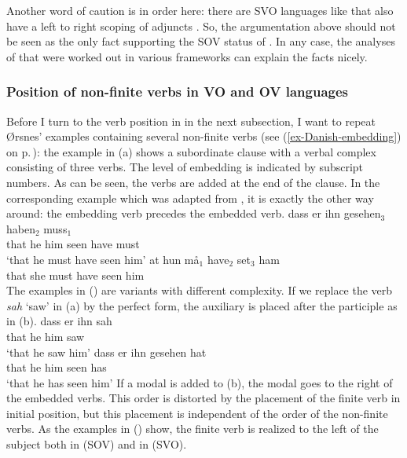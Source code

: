 Another word of caution is in order here: there are SVO languages like  that also have a left
to right scoping of adjuncts \citep[--161]{BGK2004a-u}. So, the argumentation above should not be seen as the only
fact supporting the SOV status of . In any case, the analyses of  that were
worked out in various frameworks can explain the facts nicely.


\subsubsection{Position of non-finite verbs in VO and OV languages}

Before I turn to the verb position in  in the next subsection, I want to repeat Ørsnes'
examples containing several non-finite verbs (see (\ref{ex-Danish-embedding}) on p.\,\pageref{ex-Danish-embedding}): the example in (a) shows a  subordinate clause with a verbal complex consisting of
three verbs. The level of embedding is indicated by subscript numbers. As can be seen, the verbs are
added at the end of the clause. In the corresponding  example which was adapted from \citet[]{Oersnes2009b}, it is exactly the other way
around: the embedding verb precedes the embedded verb.
\eal
\ex
\gll dass er ihn gesehen$_3$ haben$_2$ muss$_1$\\
     that he him seen        have      must\\\german
\glt `that he must have seen him'
\ex
\gll at hun må$_1$ have$_2$ set$_3$ ham\\
     that she must have seen him\\\danish
\zl
%
The examples in () are variants with different complexity. If we replace the verb
\emph{sah} `saw' in (a) by the perfect form, the auxiliary is placed after the participle as
in (b).
\eal
\ex
\gll dass er ihn sah\\
     that he him saw\\\german
\glt `that he saw him'
\ex
\gll dass er ihn gesehen hat\\
     that he him seen    has\\
\glt `that he has seen him'
\zl 
If a modal is added to (b), the modal goes to the right of the embedded verbs. This order is
distorted by the placement of the finite verb in initial position, but this placement is independent
of the order of the non-finite verbs. As the examples in () show, the finite verb is realized
to the left of the subject both in  (SOV) and in  (SVO).

